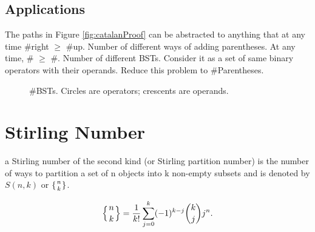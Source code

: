 \subsection{Applications}
The paths in Figure \ref{fig:catalanProof} can be abstracted to anything that at any time \#right $\geq$ \#up. 
Number of different ways of adding parentheses. At any time, \#\pyinline{(} $\geq$ \#\pyinline{)}.
Number of different BSTs. Consider it as a set of same binary operators with their operands. Reduce this problem to \#Parentheses. 
\begin{figure}[hbtp]
\centering
{}
\caption{\#BSTs. Circles are operators; crescents are operands.}
\label{fig:NumberOfBSTs}
\end{figure}

\section{Stirling Number}
a Stirling number of the second kind (or Stirling partition number) is the number of ways to partition a set of n objects into k non-empty subsets and is denoted by $S(n,k)$ or  $\lbrace{n\atop k}\rbrace$.

$$
\left\{ {n \atop k}\right\} = \frac{1}{k!}\sum_{j=0}^{k} (-1)^{k-j} \binom{k}{j} j^n.
$$
